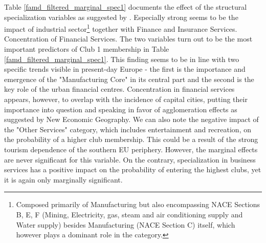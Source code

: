 \documentclass[11pt]{article}
\begin{document}
Table \ref{famd_filtered_marginal_spec1} documents the effect of the structural specialization variables as suggested by \citet{cutrini2019economic}. Especially strong seems to be the impact of industrial sector\footnote{Composed primarily of Manufacturing but also encompassing NACE Sections B, E, F (Mining, Electricity, gas, steam and air conditioning supply and Water supply) besides Manufacturing (NACE Section C) itself, which however plays a dominant role in the category.} together with Finance and Insurance Services. Concentration of Financial Services. The two variables turn out to be the most important predictors of Club 1 membership in Table \ref{famd_filtered_marginal_spec1}. This finding seems to be in line with two specific trends visible in present-day Europe - the first is the importance and emergence of the "Manufacturing Core" in its central part and the second is the key role of the urban financial centres. Concentration in financial services appears, however, to overlap with the incidence of capital cities, putting their importance into question and speaking in favor of agglomeration effects as suggested by New Economic Geography.
We can also note the negative impact of the "Other Services" category, which includes entertainment and recreation, on the probability of a higher club membership. This could be a result of the strong tourism dependence of the southern EU periphery. However, the marginal effects are never significant for this variable. On the contrary, specialization in business services has a positive impact on the probability of entering the highest clubs, yet it is again only marginally significant.
\end{document}
